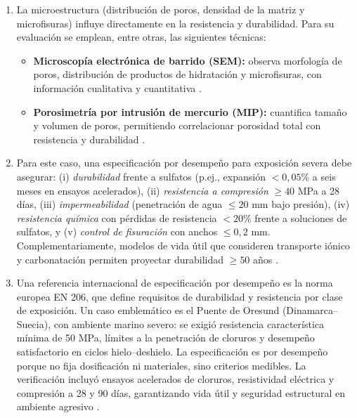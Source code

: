 \begin{enumerate}
    \item La microestructura (distribución de poros, densidad de la matriz y microfisuras) influye directamente en la resistencia y durabilidad. Para su evaluación se emplean, entre otras, las siguientes técnicas:
    \begin{itemize}
        \item \textbf{Microscopía electrónica de barrido (SEM):} observa morfología de poros, distribución de productos de hidratación y microfisuras, con información cualitativa y cuantitativa \citep{Diamond1999}.
        \item \textbf{Porosimetría por intrusión de mercurio (MIP):} cuantifica tamaño y volumen de poros, permitiendo correlacionar porosidad total con resistencia y durabilidad \citep{Gallucci2012}.
    \end{itemize}
    
    \item Para este caso, una especificación por desempeño para exposición severa debe asegurar: (i) \textit{durabilidad} frente a sulfatos (p.ej., expansión $<0{,}05\%$ a seis meses en ensayos acelerados), (ii) \textit{resistencia a compresión} $\geq 40$ MPa a 28 días, (iii) \textit{impermeabilidad} (penetración de agua $\leq 20$ mm bajo presión), (iv) \textit{resistencia química} con pérdidas de resistencia $<20\%$ frente a soluciones de sulfatos, y (v) \textit{control de fisuración} con anchos $\leq 0{,}2$ mm. Complementariamente, modelos de vida útil que consideren transporte iónico y carbonatación permiten proyectar durabilidad $\geq 50$ años \citep{NCh170-2016,ConcreteSociety2006}.
    
    \item Una referencia internacional de especificación por desempeño es la norma europea EN 206, que define requisitos de durabilidad y resistencia por clase de exposición. Un caso emblemático es el Puente de Oresund (Dinamarca–Suecia), con ambiente marino severo: se exigió resistencia característica mínima de 50 MPa, límites a la penetración de cloruros y desempeño satisfactorio en ciclos hielo–deshielo. La especificación es por desempeño porque no fija dosificación ni materiales, sino criterios medibles. La verificación incluyó ensayos acelerados de cloruros, resistividad eléctrica y compresión a 28 y 90 días, garantizando vida útil y seguridad estructural en ambiente agresivo \citep{EN206,ConcreteSociety2006}.
\end{enumerate}
